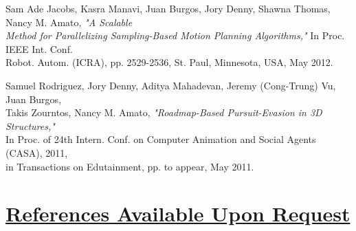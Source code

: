 \documentclass[8pt]{res}
\begin{document}
\begin{resume}
      Sam Ade Jacobs, Kasra Manavi, Juan Burgos, Jory Denny, Shawna Thomas, Nancy M. Amato, \emph{"A Scalable \\
      Method for Parallelizing Sampling-Based Motion Planning Algorithms,"} In Proc. IEEE Int. Conf. \\
      Robot. Autom. (ICRA), pp. 2529-2536, St. Paul, Minnesota, USA, May 2012. 

      Samuel Rodriguez, Jory Denny, Aditya Mahadevan, Jeremy (Cong-Trung) Vu, Juan Burgos, \\
      Takis Zourntos, Nancy M. Amato, \emph{"Roadmap-Based Pursuit-Evasion in 3D Structures,"} \\
      In Proc. of 24th Intern. Conf. on Computer Animation and Social Agents (CASA), 2011, \\
      in Transactions on Edutainment, pp. to appear, May 2011.


    \section{\underline{References Available Upon Request}}


  \end{resume}
\end{document}

